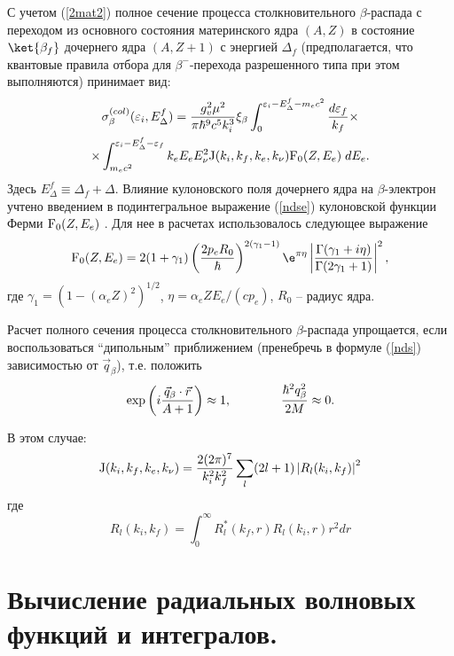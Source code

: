 С учетом (\ref{2mat2}) полное сечение процесса столкновительного
$\beta$-распада с переходом из основного состояния материнского ядра $(A,Z)$
в состояние $\ket{\beta_f}$ дочернего ядра $(A,Z+1)$ с энергией
$\Delta_f$
(предполагается, что квантовые правила отбора для $\beta^-$-перехода
разрешенного типа при этом
выполняются) принимает вид:
\begin{multline}\label{ndse}
\sigma^{(col)}_\beta(\varepsilon_i, E^f_\Delta)=
{{g_v^2 \mu ^2}\over{\pi \hbar^9 c^5 k_i^3}} \xi_\beta
\int_{0}^{\varepsilon_i-E^f_\Delta-m_ec^2}{{d\varepsilon_f}\over{k_f}}\times\\
\times\int_{m_e c^2}^{\varepsilon_i-E^f_\Delta-\varepsilon_f}{k_e E_e E^2_\nu
{\rm J}(k_i, k_f, k_e, k_\nu) {\rm F_0}(Z,E_e)\; dE_e}.
\end{multline}
Здесь $E^f_\Delta\equiv \Delta_f+\Delta$. Влияние кулоновского поля дочернего ядра на $\beta$-электрон учтено введением в
подинтегральное выражение (\ref{ndse}) кулоновской функции Ферми ${\rm F_0}(Z,E_e)$ \cite{aiz}. Для нее в расчетах
использовалось следующее выражение
\begin{equation}\label{fun_F}
{\rm F_0}(Z,E_e)=2(1+\gamma_1)\left({{2 p_e R_0}\over{\hbar}}\right)^{2(\gamma_1-1)}\e^{\pi \eta}
\left|{{\Gamma(\gamma_1+i \eta )}\over{\Gamma(2\gamma_1+1)}}\right|^2,
\end{equation}
где $\gamma_1=(1-(\alpha_e Z)^2)^{1/2}$, $\eta=\alpha_e Z E_e/(c p_e)$,
$R_0$ -- радиус ядра.


 Расчет полного сечения процесса столкновительного $\beta$-распада
упрощается, если воспользоваться ``дипольным'' приближением (пренебречь в формуле
(\ref{nds})
зависимостью от $\vec q_\beta$), т.е. положить
\begin{eqnarray}\label{dip}
\exp \bigg(i{{\vec q_\beta \cdot \vec r}\over{A+1}}\bigg)\approx 1,
\qquad \qquad {{\hbar^2 q_\beta^2}\over{2M}}\approx 0.
\end{eqnarray}

В этом случае:
\begin{eqnarray}\label{Jdip}
{\rm J}(k_i, k_f,k_e,k_\nu)={2(2\pi)^7 \over k_i^2 k_f^2}\sum_{l} (2l+1)\left|R_l(k_i,k_f)\right|^2
\end{eqnarray}
где
\begin{equation}
R_l(k_i,k_f)=\int_{0}^{\infty}R^*_l(k_f,r)R_l(k_i,r) r^2 dr
\end{equation}


\section{Вычисление радиальных волновых \\ функций и интегралов.}

